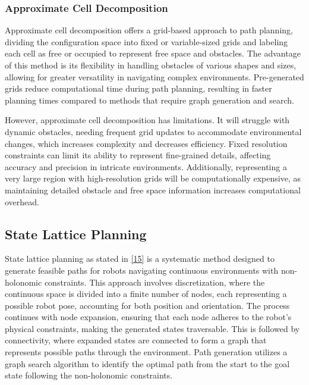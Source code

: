 \subsubsection{Approximate Cell Decomposition}


Approximate cell decomposition offers a grid-based approach to path planning, dividing the configuration space into fixed or variable-sized grids and labeling each cell as free or occupied to represent free space and obstacles. The advantage of this method is its flexibility in handling obstacles of various shapes and sizes, allowing for greater versatility in navigating complex environments. Pre-generated grids reduce computational time during path planning, resulting in faster planning times compared to methods that require graph generation and search.

\vspace{3mm}

However, approximate cell decomposition has limitations. It will struggle with dynamic obstacles, needing frequent grid updates to accommodate environmental changes, which increases complexity and decreases efficiency. Fixed resolution constraints can limit its ability to represent fine-grained details, affecting accuracy and precision in intricate environments. Additionally, representing a very large region with high-resolution grids will be computationally expensive, as maintaining detailed obstacle and free space information increases computational overhead.

\subsection{State Lattice Planning}
State lattice planning as stated in \hyperlink{cite.state_lattice}{[15]} is a systematic method designed to generate feasible paths for robots navigating continuous environments with non-holonomic constraints. This approach involves discretization, where the continuous space is divided into a finite number of nodes, each representing a possible robot pose, accounting for both position and orientation. The process continues with node expansion, ensuring that each node adheres to the robot's physical constraints, making the generated states traversable. This is followed by connectivity, where expanded states are connected to form a graph that represents possible paths through the environment. Path generation utilizes a graph search algorithm to identify the optimal path from the start to the goal state following the non-holonomic constraints.

